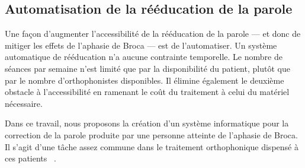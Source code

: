 \subsection{Automatisation de la rééducation de la parole}

Une façon d'augmenter l'accessibilité de la rééducation de la parole 
--- et donc de mitiger les effets de l'aphasie de Broca ---
est de l'automatiser.
Un système automatique de rééducation n'a aucune contrainte temporelle.
Le nombre de séances par semaine n'est limité que par la disponibilité du patient,
plutôt que par le nombre d'orthophonistes disponibles.
Il élimine également le deuxième obstacle à l'accessibilité
en ramenant le coût du traitement à celui du matériel nécessaire.

Dans ce travail, nous proposons la création d'un système informatique 
pour la correction de la parole produite par une personne atteinte de l'aphasie de Broca.
Il s'agit d'une tâche assez commune dans le traitement orthophonique dispensé à ces patients%
~\cite{recover,Acharya_Wroten_2022}.